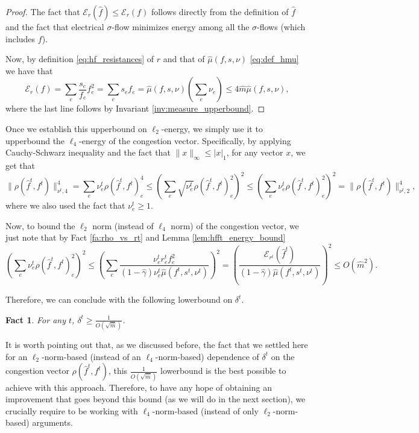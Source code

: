 \documentclass[11pt, letterpaper]{article}
\newtheorem{fact}[theorem]{Fact}
\newcommand{\norm}[2]{\|#1\|_{#2}}
\newcommand{\onorm}[1]{|#1|_{1}}
\newcommand{\inorm}[1]{\|#1\|_{\infty}}
\newcommand{\hm}{\widehat{m}}
\newcommand{\energy}[2]{\mathcal{E}_{#1}(#2)}
\newcommand{\hmu}{\hat{\mu}}
\newcommand{\hgamma}{\hat{\gamma}}
\newcommand{\vrho}{\boldsymbol{\mathit{\rho}}}
\newcommand{\vnu}{\boldsymbol{\mathit{\nu}}}
\newcommand{\vsigma}{\boldsymbol{\mathit{\sigma}}}
\newcommand{\ff}{\boldsymbol{\mathit{f}}}
\newcommand{\hff}{\boldsymbol{\mathit{\hat{f}}}}
\newcommand{\rr}{\boldsymbol{\mathit{r}}}
\renewcommand{\ss}{\boldsymbol{\mathit{s}}}
\newcommand{\xx}{\boldsymbol{\mathit{x}}}
\begin{document}
\begin{proof}
The fact that $\energy{\rr}{\hff}\leq \energy{\rr}{\ff}$ follows directly from the definition of $\hff$ and the fact that electrical $\vsigma$-flow minimizes energy among all the $\vsigma$-flows (which includes $\ff$). 

Now, by definition \eqref{eq:hf_resistances}  of $\rr$ and that of $\hmu(\ff,\ss,\vnu)$ \eqref{eq:def_hmu} we have that
\[
\energy{\rr}{\ff} = \sum_e \frac{s_e}{f_e} f_e^2 = \sum_e s_e f_e = \hmu(\ff,\ss,\vnu) (\sum_e \nu_e) \leq 4 \hm \hmu(\ff,\ss,\vnu),
\]
where the last line follows by Invariant \ref{inv:measure_upperbound}.
\end{proof}

Once we establish this upperbound on $\ell_2$-energy, we simply use it to upperbound the $\ell_4$-energy of the congestion vector. Specifically, by applying Cauchy-Schwarz inequality and the fact that $\inorm{\xx}\leq \onorm{\xx}$, for any vector $\xx$, we get that
\[
\norm{\vrho(\hff^t,\ff^t)}{\vnu^t,4}^4=\sum_e \nu_e^t \rho(\hff^t,\ff^t)_e^4 \leq \left(\sum_e \sqrt{\nu_e^t} \rho(\hff^t,\ff^t)_e^2\right)^2 \leq  \left(\sum_e \nu_e^t \rho(\hff^t,\ff^t)_e^2\right)^2 = \norm{\vrho(\hff^t,\ff^t)}{\vnu^t,2}^4,
\]
where we also used the fact that $\nu_e^t\geq 1$. 

Now, to bound the $\ell_2$ norm (instead of $\ell_4$ norm) of the congestion vector, we just note that by Fact \ref{fa:rho_vs_rt} and Lemma \ref{lem:hfft_energy_bound}
\begin{equation}
\label{eq:worst_case_rho}
\left(\sum_e \nu_e^t \rho(\hff^t,\ff^t)_e^2\right)^2 \leq \left(\sum_e  \frac{\nu_e^t r^t_ef^2_e}{(1-\hgamma)\nu_e^t \hmu(\ff^t,\ss^t,\vnu^t)}\right)^2 = \left(\frac{\energy{\rr^t}{\hff^t}}{(1-\hgamma)\hmu(\ff^t,\ss^t,\vnu^t)}\right)^2\leq O(\hm^2).
\end{equation} 

Therefore, we can conclude with the following lowerbound on $\delta^t$. 

\begin{fact}
\label{fa:basic_delta_lowerbound}
For any $t$, $\delta^t\geq \frac{1}{O(\sqrt{\hm})}$.
\end{fact}

It is worth pointing out that, as we discussed before, the fact that we settled here for an $\ell_2$-norm-based (instead of an $\ell_4$-norm-based) dependence of $\delta^t$ on the congestion vector $\vrho(\hff^t,\ff^t)$, this $\frac{1}{O(\sqrt{\hm})}$ lowerbound is the best possible to achieve with this approach. Therefore, to have any hope of obtaining an improvement that goes beyond this bound (as we will do in the next section), we crucially require to be working with $\ell_4$-norm-based (instead of only $\ell_2$-norm-based) arguments. 
\end{document}
